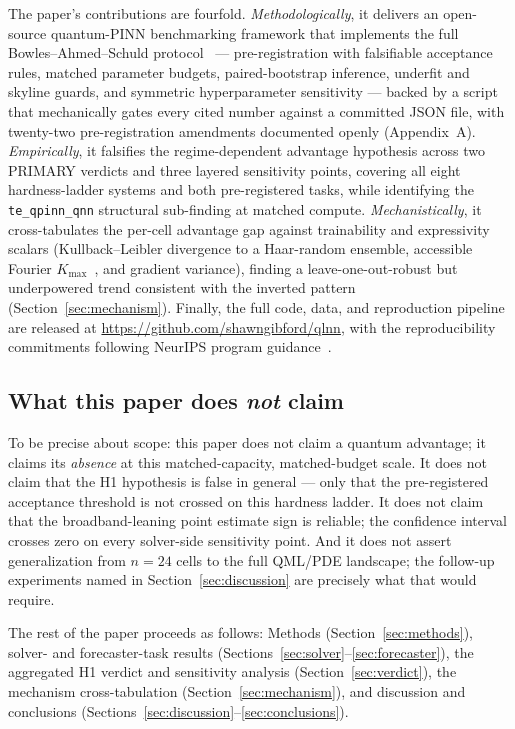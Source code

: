 The paper's contributions are fourfold. \emph{Methodologically}, it
delivers an open-source quantum-PINN benchmarking framework that
implements the full Bowles--Ahmed--Schuld
protocol~\cite{bowles2024better} --- pre-registration with falsifiable
acceptance rules, matched parameter budgets, paired-bootstrap
inference, underfit and skyline guards, and symmetric hyperparameter
sensitivity --- backed by a script that mechanically gates every cited
number against a committed JSON file, with twenty-two pre-registration
amendments documented openly (Appendix~A). \emph{Empirically}, it
falsifies the regime-dependent advantage hypothesis across two PRIMARY
verdicts and three layered sensitivity points, covering all eight
hardness-ladder systems and both pre-registered tasks, while
identifying the \texttt{te\_qpinn\_qnn} structural sub-finding at
matched compute. \emph{Mechanistically}, it cross-tabulates the
per-cell advantage gap against trainability and expressivity scalars
(Kullback--Leibler divergence to a Haar-random ensemble, accessible
Fourier $K_{\max}$~\cite{schuld2021effect}, and gradient variance),
finding a leave-one-out-robust but underpowered trend consistent with
the inverted pattern (Section~\ref{sec:mechanism}). Finally, the full
code, data, and reproduction pipeline are released at
\url{https://github.com/shawngibford/qlnn}, with the reproducibility
commitments following NeurIPS program guidance~\cite{pineau2021improving}.

\subsection*{What this paper does \emph{not} claim}

To be precise about scope: this paper does not claim a quantum
advantage; it claims its \emph{absence} at this matched-capacity,
matched-budget scale. It does not claim that the H1 hypothesis is false
in general --- only that the pre-registered acceptance threshold is not
crossed on this hardness ladder. It does not claim that the
broadband-leaning point estimate sign is reliable; the confidence
interval crosses zero on every solver-side sensitivity point. And it
does not assert generalization from $n=24$ cells to the full QML/PDE
landscape; the follow-up experiments named in
Section~\ref{sec:discussion} are precisely what that would require.

The rest of the paper proceeds as follows: Methods
(Section~\ref{sec:methods}), solver- and forecaster-task results
(Sections~\ref{sec:solver}--\ref{sec:forecaster}), the aggregated H1
verdict and sensitivity analysis (Section~\ref{sec:verdict}), the
mechanism cross-tabulation (Section~\ref{sec:mechanism}), and
discussion and conclusions
(Sections~\ref{sec:discussion}--\ref{sec:conclusions}).
